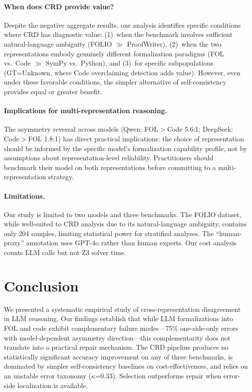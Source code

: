 \documentclass[11pt]{article}
\begin{document}
\paragraph{When does CRD provide value?} Despite the negative aggregate results, our analysis identifies specific conditions where CRD has diagnostic value: (1)~when the benchmark involves sufficient natural-language ambiguity (FOLIO $\gg$ ProofWriter), (2)~when the two representations embody genuinely different formalization paradigms (FOL vs.\ Code $\gg$ SymPy vs.\ Python), and (3)~for specific subpopulations (GT=Unknown, where Code overclaiming detection adds value). However, even under these favorable conditions, the simpler alternative of self-consistency provides equal or greater benefit.

\paragraph{Implications for multi-representation reasoning.} The asymmetry reversal across models (Qwen: FOL$>$Code 5.6:1; DeepSeek: Code$>$FOL 1.8:1) has direct practical implications: the choice of representation should be informed by the specific model's formalization capability profile, not by assumptions about representation-level reliability. Practitioners should benchmark their model on both representations before committing to a multi-representation strategy.

\paragraph{Limitations.} Our study is limited to two models and three benchmarks. The FOLIO dataset, while well-suited to CRD analysis due to its natural-language ambiguity, contains only 204 samples, limiting statistical power for stratified analyses. The ``human-proxy'' annotation uses GPT-4o rather than human experts. Our cost analysis counts LLM calls but not Z3 solver time.

\section{Conclusion}

We presented a systematic empirical study of cross-representation disagreement in LLM reasoning. Our findings establish that while LLM formalizations into FOL and code exhibit complementary failure modes---75\% one-side-only errors with model-dependent asymmetry direction---this complementarity does not translate into a practical repair mechanism. The CRD pipeline produces no statistically significant accuracy improvement on any of three benchmarks, is dominated by simpler self-consistency baselines on cost-effectiveness, and relies on an unstable error taxonomy ($\kappa$=0.33). Selection outperforms repair when error-side localization is available.
\end{document}
